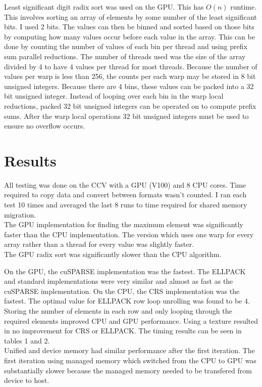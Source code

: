 \documentclass{article}
\begin{document}
Least significant digit radix sort was used on the GPU. This has $O(n)$
runtime. This involves sorting an array of elements by some number of the least
significant bits. I used 2 bits. The values can then be binned and sorted based
on those bits by computing how many values occur before each value in the
array. This can be done by counting the number of values of each bin per thread
and using prefix sum parallel reductions. The number of threads used was the
size of the array divided by 4 to have 4 values per thread for most threads.
Because the number of values per warp is less than 256, the counts per each
warp may be stored in 8 bit unsigned integers. Because there are 4 bins,
these values can be packed into a 32 bit unsigned integer. Instead of looping 
over each bin in the warp local reductions, packed 32 bit unsigned integers
can be operated on to compute prefix sums. After the warp local operations
32 bit unsigned integers must be used to ensure no overflow occurs.

\section{Results}

All testing was done on the CCV with a GPU (V100) and 8 CPU cores.  Time
required to copy data and convert between formats wasn't counted. I ran each
test 10 times and averaged the last 8 runs to time required for shared memory
migration. \\

The GPU implementation for finding the maximum element was significantly faster
than the CPU implementation. The version which uses one warp for every array
rather than a thread for every value was slightly faster. \\

The GPU radix sort was significantly slower than the CPU algorithm.
 
On the GPU, the cuSPARSE implementation was the fastest.  The ELLPACK and
standard implementations were very similar and almost as fast as the cuSPARSE
implementation. On the CPU, the CRS implementation was the fastest. The optimal
value for ELLPACK row loop unrolling was found to be 4.  Storing the number of
elements in each row and only looping through the required elements improved
CPU and GPU performance.  Using a texture resulted in no improvement for CRS or
ELLPACK.  The timing results can be seen in tables 1 and 2. \\

Unified and device memory had similar performance after the first iteration.
The first iteration using managed memory which switched from the CPU to GPU was
substantially slower because the managed memory needed to be transfered from
device to host. \\
\end{document}
